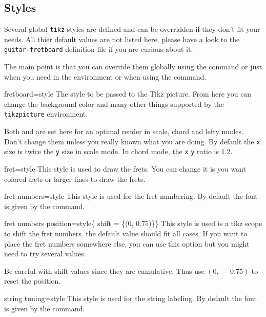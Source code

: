 \documentclass[a4paper]{article}
\newcommand{\pkg}[1]{\texttt{#1}}
\begin{document}
\subsection{Styles}

Several global \pkg{tikz} styles are defined and can be overridden if they
don't fit your needs. All thier default values are not listed here, please
have a look to the \pkg{guitar-fretboard} definition file if you are curious
about it.

The main point is that you can override them globally using the 
command or just when you need in the  environment or when using
the  command.

\begin{docKey}[tikz][]{fretboard}{=style}{}
  The style to be passed to the Tikz picture. From here you can change the
  background color and many other things supported by the \pkg{tikzpicture}
  environment.

  Both  and  are set here for an optimal render in
  scale, chord and lefty modes. Don't change them unless you really known
  what you are doing. By default the \pkg{x} size is twice the \pkg{y} size
  in scale mode. In chord mode, the \pkg{x} \pkg{y} ratio is 1.2.
\end{docKey}

\begin{docKey}[tikz][]{fret}{=style}{}
  This style is used to draw the frets. You can change it is you want
  colored frets or larger lines to draw the frets.
\end{docKey}

\begin{docKey}[tikz][]{fret numbers}{=style}{}
  This style is used for the fret numbering. By default the font is given by
  the  command.
\end{docKey}

\begin{docKey}[tikz][]{fret numbers position}{=style}{\{ shift = \{(0, 0.75)\}\}}
  This style is used is a tikz scope to shift the fret numbers. the default
  value should fit all cases. If you want to place the fret numbers
  somewhere else, you can use this option but you might need to try several
  values.

  Be careful with shift values since they are cumulative. Thus use
  $(0,~-0.75)$ to reset the position.
\end{docKey}

\begin{docKey}[tikz][]{string tuning}{=style}{}
  This style is used for the string labeling. By default the font is given
  by the  command.
\end{docKey}
\end{document}
